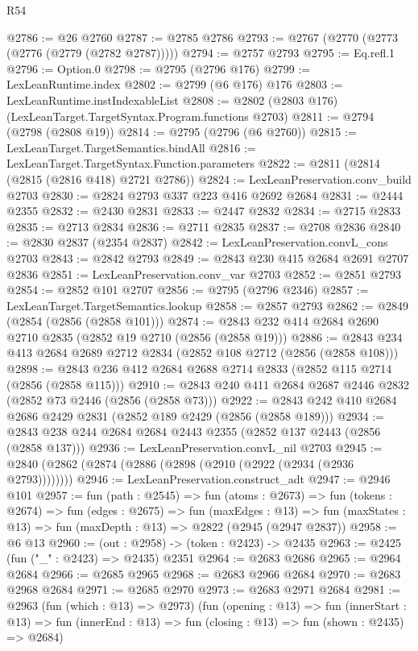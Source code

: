 \begin{lexlean}{R54}
\begin{coremodule}
@2786 := @26 @2760
@2787 := @2785 @2786
@2793 := @2767 (@2770 (@2773 (@2776 (@2779 (@2782 @2787)))))
@2794 := @2757 @2793
@2795 := Eq.refl.{1}
@2796 := Option.{0}
@2798 := @2795 (@2796 @176)
@2799 := LexLeanRuntime.index
@2802 := @2799 (@6 @176) @176
@2803 := LexLeanRuntime.instIndexableList
@2808 := @2802 (@2803 @176) (LexLeanTarget.TargetSyntax.Program.functions @2703)
@2811 := @2794 (@2798 (@2808 @19))
@2814 := @2795 (@2796 (@6 @2760))
@2815 := LexLeanTarget.TargetSemantics.bindAll
@2816 := LexLeanTarget.TargetSyntax.Function.parameters
@2822 := @2811 (@2814 (@2815 (@2816 @418) @2721 @2786))
@2824 := LexLeanPreservation.conv_build @2703
@2830 := @2824 @2793 @337 @223 @416 @2692 @2684
@2831 := @2444 @2355
@2832 := @2430 @2831
@2833 := @2447 @2832
@2834 := @2715 @2833
@2835 := @2713 @2834
@2836 := @2711 @2835
@2837 := @2708 @2836
@2840 := @2830 @2837 (@2354 @2837)
@2842 := LexLeanPreservation.convL_cons @2703
@2843 := @2842 @2793
@2849 := @2843 @230 @415 @2684 @2691 @2707 @2836
@2851 := LexLeanPreservation.conv_var @2703
@2852 := @2851 @2793
@2854 := @2852 @101 @2707
@2856 := @2795 (@2796 @2346)
@2857 := LexLeanTarget.TargetSemantics.lookup
@2858 := @2857 @2793
@2862 := @2849 (@2854 (@2856 (@2858 @101)))
@2874 := @2843 @232 @414 @2684 @2690 @2710 @2835 (@2852 @19 @2710 (@2856 (@2858 @19)))
@2886 := @2843 @234 @413 @2684 @2689 @2712 @2834 (@2852 @108 @2712 (@2856 (@2858 @108)))
@2898 := @2843 @236 @412 @2684 @2688 @2714 @2833 (@2852 @115 @2714 (@2856 (@2858 @115)))
@2910 := @2843 @240 @411 @2684 @2687 @2446 @2832 (@2852 @73 @2446 (@2856 (@2858 @73)))
@2922 := @2843 @242 @410 @2684 @2686 @2429 @2831 (@2852 @189 @2429 (@2856 (@2858 @189)))
@2934 := @2843 @238 @244 @2684 @2684 @2443 @2355 (@2852 @137 @2443 (@2856 (@2858 @137)))
@2936 := LexLeanPreservation.convL_nil @2703
@2945 := @2840 (@2862 (@2874 (@2886 (@2898 (@2910 (@2922 (@2934 (@2936 @2793))))))))
@2946 := LexLeanPreservation.construct_adt
@2947 := @2946 @101
@2957 := fun (path : @2545) =>
  fun (atoms : @2673) =>
  fun (tokens : @2674) =>
  fun (edges : @2675) =>
  fun (maxEdges : @13) =>
  fun (maxStates : @13) => fun (maxDepth : @13) => @2822 (@2945 (@2947 @2837))
@2958 := @6 @13
@2960 := (out : @2958) -> (token : @2423) -> @2435
@2963 := @2425 (fun ("_" : @2423) => @2435) @2351
@2964 := @2683 @2686
@2965 := @2964 @2684
@2966 := @2685 @2965
@2968 := @2683 @2966 @2684
@2970 := @2683 @2968 @2684
@2971 := @2685 @2970
@2973 := @2683 @2971 @2684
@2981 := @2963
    (fun (which : @13) => @2973)
    (fun (opening : @13) =>
    fun (innerStart : @13) =>
    fun (innerEnd : @13) => fun (closing : @13) => fun (shown : @2435) => @2684)

\end{coremodule}
\end{lexlean}
